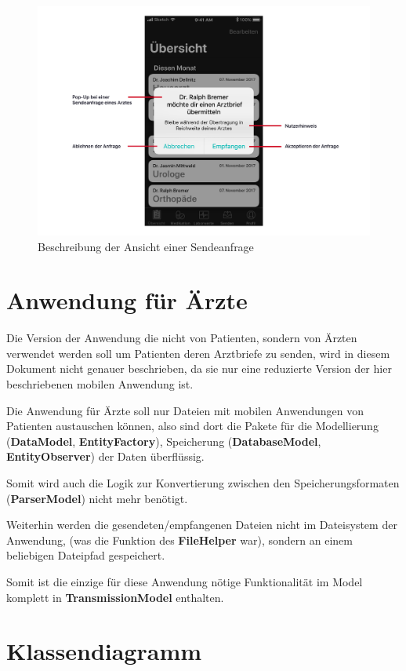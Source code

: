 \documentclass[a4paper]{scrreprt}
\begin{document}
\begin{figure}
\includegraphics[width=1\textwidth]{graphics/UIDescriptions/PopUpDesc}
\caption{Beschreibung der Ansicht einer Sendeanfrage}
\end{figure}

\chapter{Anwendung für Ärzte}
Die Version der Anwendung die nicht von Patienten, sondern von Ärzten verwendet werden soll um Patienten deren Arztbriefe zu senden, wird in diesem Dokument nicht genauer beschrieben, da sie nur eine reduzierte Version der hier beschriebenen mobilen Anwendung ist. 

Die Anwendung für Ärzte soll nur Dateien mit mobilen Anwendungen von Patienten austauschen können, also
sind dort die Pakete für die Modellierung (\textbf{DataModel}, \textbf{EntityFactory}), Speicherung (\textbf{DatabaseModel}, \textbf{EntityObserver}) der Daten überflüssig. 

Somit wird auch die Logik zur Konvertierung zwischen den Speicherungsformaten (\textbf{ParserModel}) nicht mehr benötigt. 

Weiterhin werden die gesendeten/empfangenen Dateien nicht im Dateisystem der Anwendung, (was die Funktion des \textbf{FileHelper} war), sondern an einem beliebigen Dateipfad gespeichert.

Somit ist die einzige für diese Anwendung nötige Funktionalität im Model komplett in \textbf{TransmissionModel} enthalten.


\chapter{Klassendiagramm}


\printnoidxglossaries

\listoffigures
 
\end{document}
